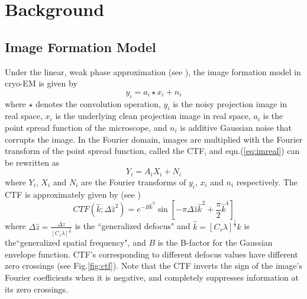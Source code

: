 \documentclass{article}
\begin{document}
\section{Background}
\subsection{Image Formation Model}
Under the linear, weak phase approximation (see \cite[Chapter~2]{frankbook}), the image formation model in cryo-EM is given by
\begin{equation}
y_i = a_i\star x_i + n_i
\label{eq:imreal}
\end{equation}
where $\star$ denotes the convolution operation, $y_i$ is the noisy projection image in real space, $x_i$ is the underlying clean projection image in real space, $a_i$ is the point spread function of the microscope, and $n_i$ is additive Gaussian noise that corrupts the image. In the Fourier domain, images are multiplied with the Fourier transform of the point spread function, called the CTF, and eqn.(\ref{eq:imreal}) can be rewritten as
\begin{equation}
Y_i = A_iX_i + N_i
\label{eq:imfour}
\end{equation}
where $Y_i$, $X_i$ and $N_i$ are the Fourier transforms of $y_i$, $x_i$ and $n_i$ respectively.
The CTF is approximately  given by (see  \cite[Chapter~3]{frankbook})
\begin{equation}
CTF(\hat{k};\Delta\hat{z}^2)= e^{-{B\hat{k}}^2}\sin[-\pi \Delta\hat{z}\hat{k}^2 + \frac{\pi}{2} \hat{k}^4]
\label{eq:ctf}
\end{equation}
where 
$\Delta\hat{z}=\frac{\Delta z}{[C_s \lambda]^{\frac{1}{2}}}$ is the ``generalized defocus" and $\hat{k}=[C_s \lambda]^{\frac{1}{4}}k$ is the``generalized spatial frequency", and $B$ is the B-factor for the Gaussian envelope function. CTF's corresponding to different defocus values have different zero crossings (see Fig.\ref{fig:ctf}). Note that the CTF inverts the sign of the image's Fourier coefficients when it is negative, and completely suppresses information at its zero crossings.
\end{document}
